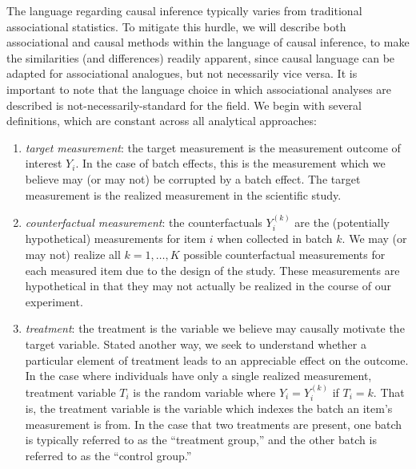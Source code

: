 The language regarding causal inference typically varies from traditional associational statistics. To mitigate this hurdle, we will describe both associational and causal methods within the language of causal inference, to make the similarities (and differences) readily apparent, since causal language can be adapted for associational analogues, but not necessarily vice versa. It is important to note that the language choice in which associational analyses are described is not-necessarily-standard for the field. We begin with several definitions, which are constant across all analytical approaches:
\begin{enumerate}
\item \textit{target measurement}: the target measurement is the measurement outcome of interest $Y_i$. In the case of batch effects, this is the measurement which we believe may (or may not) be corrupted by a batch effect. The target measurement is the realized measurement in the scientific study.
\item \textit{counterfactual measurement}: the counterfactuals $Y_i^{(k)}$ are the (potentially hypothetical) measurements for item $i$ when collected in batch $k$. We may (or may not) realize all $k = 1, \hdots, K$ possible counterfactual measurements for each measured item due to the design of the study. These measurements are hypothetical in that they may not actually be realized in the course of our experiment.
\item \textit{treatment}: the treatment is the variable we believe may causally motivate the target variable. Stated another way, we seek to understand whether a particular element of treatment leads to an appreciable effect on the outcome. In the case where individuals have only a single realized measurement, treatment variable $T_i$ is the random variable where $Y_i = Y_i^{(k)}$ if $T_i = k$. That is, the treatment variable is the variable which indexes the batch an item's measurement is from. In the case that two treatments are present, one batch is typically referred to as the ``treatment group,'' and the other batch is referred to as the ``control group.''

\end{enumerate}
